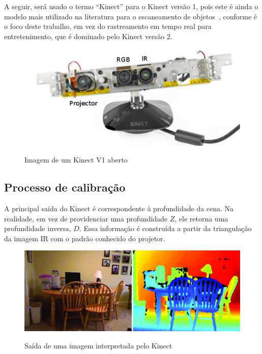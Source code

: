 A seguir, será usado o termo ``Kinect'' para o Kinect versão 1, pois este é ainda
o modelo mais utilizado na literatura para o escaneamento de objetos~\cite{doi:10.1177/0278364911434148}, conforme
é o foco deste trabalho, em vez do rastreamento em tempo real para entretenimento, que é
dominado pelo Kinect versão 2.

\begin{figure}[!h]
	\centering
	\caption{
	Imagem de um Kinect V1 aberto
	}	
	\includegraphics[width=0.5\linewidth]{figs/kinect.png}
   \label{fig:kinectv1}
\end{figure}

\subsection{Processo de calibração}

A principal saída do Kinect é correspondente à profundidade da
cena. Na realidade, em vez de providenciar uma profundidade $Z$, ele retorna uma profundidade
inversa, $D$. Essa informação é construída a partir da triangulação
da imagem IR com o padrão conhecido do projetor.

\newpage

\begin{figure}[!h]
	\centering
	\caption{Saída de uma imagem interpretada pelo Kinect}
	\includegraphics[width=1\linewidth]{figs/profundidadekinect.png}
   \label{fig:profKinect}
\end{figure}
 
